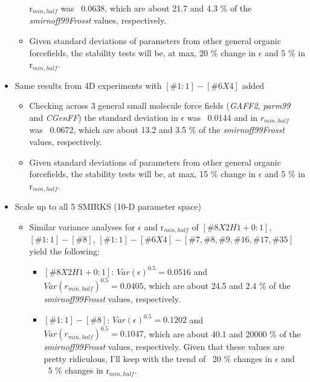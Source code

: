 \documentclass[aps,pre,nofootinbib,superscriptaddress,linenumbers,10pt, draft,tightenlines]{revtex4-1}
\begin{document}
\begin{itemize}
\begin{itemize}
                  r$_{min,half}$ was ~0.0638, which are about 21.7 and 4.3 \% of the 
                  \textit{smirnoff99Frosst} values, respectively.
            \item Given standard deviations of parameters from other general organic forcefields,
                  the stability tests will be, at max, 20 \% change in $\epsilon$ and 5 \% 
                  in r$_{min,half}$.
        \end{itemize}        
        \item Same results from 4D experiments with $[\#1:1]-[\#6X4]$ added
        \begin{itemize}
            \item Checking across 3 general small molecule force fields (\textit{GAFF2},
                  \textit{parm99} and \textit{CGenFF}) the standard deviation in $\epsilon$ 
                  was ~0.0144 and in $r_{min,half}$ was ~0.0672, which are about 13.2 and 3.5
                  \% of the \textit{smirnoff99Frosst} values, respectively. 
            \item Given standard deviations of parameters from other general organic 
                  forcefields, the stability tests will be, at max, 15 \% change in 
                  $\epsilon$ and 5 \% in r$_{min,half}$.
        \end{itemize}
        \item Scale up to all 5 SMIRKS (10-D parameter space)
        \begin{itemize}
            \item Similar variance analyses for $\epsilon$ and r$_{min,half}$ of 
                  $[\#8X2H1+0:1]$, $[\#1:1]-[\#8]$, 
                  $[\#1:1]-[\#6X4]-[\#7,\#8,\#9,\#16,\#17,\#35]$ yield the following:
            \begin{itemize}
                \item $[\#8X2H1+0:1]$: $Var\left(\epsilon\right)^{0.5} = 0.0516$ and 
                      $Var\left(r_{min,half}\right)^{0.5} = 0.0405$, which are about 
                      24.5 and 2.4 \% of the \textit{smirnoff99Frosst} values, respectively.
                \item $[\#1:1]-[\#8]$: $Var\left(\epsilon\right)^{0.5} = 0.1202$ and 
                      $Var\left(r_{min,half}\right)^{0.5} = 0.1047$, which are about 
                      40.1 and 20000 \% of the \textit{smirnoff99Frosst} values, respectively.
                      Given that these values are pretty ridiculous, I'll keep with the trend
                      of ~20 \% changes in $\epsilon$ and ~5 \% changes in r$_{min,half}$.

\end{itemize}
\end{itemize}
\end{itemize}
\end{document}
